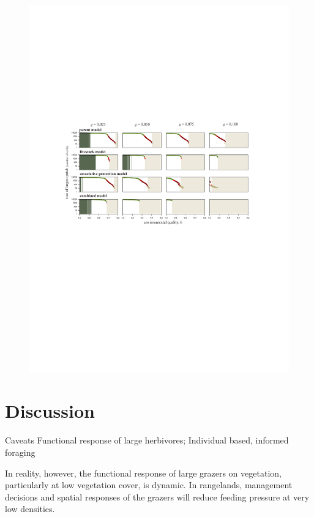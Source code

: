 \begin{figure}[h]%
\includegraphics[width=\columnwidth]{figures/fig5.pdf}%
\caption{}%
\label{}%
\end{figure}



\section{Discussion}

Caveats
Functional response of large herbivores; Individual based, informed foraging


In reality, however, the functional response of large grazers on vegetation, particularly at low vegetation cover, is dynamic. In rangelands, management decisions and spatial responses of the grazers will reduce feeding pressure at very low densities. 

